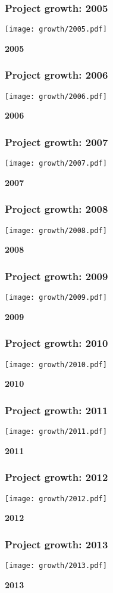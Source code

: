 \documentclass[10pt,xetex]{beamer} %
\begin{document}
\begin{frame}
  \frametitle{Project growth: 2005}
\parbox{0.8\textwidth}{\texttt{[image: growth/2005.pdf]}}\parbox{0.2\textwidth}{{\bf 2005}}

\end{frame}
\begin{frame}
  \frametitle{Project growth: 2006}
\parbox{0.8\textwidth}{\texttt{[image: growth/2006.pdf]}}\parbox{0.2\textwidth}{{\bf 2006}}

\end{frame}
\begin{frame}
  \frametitle{Project growth: 2007}
\parbox{0.8\textwidth}{\texttt{[image: growth/2007.pdf]}}\parbox{0.2\textwidth}{{\bf 2007}}

\end{frame}
\begin{frame}
  \frametitle{Project growth: 2008}
\parbox{0.8\textwidth}{\texttt{[image: growth/2008.pdf]}}\parbox{0.2\textwidth}{{\bf 2008}}

\end{frame}
\begin{frame}
  \frametitle{Project growth: 2009}
\parbox{0.8\textwidth}{\texttt{[image: growth/2009.pdf]}}\parbox{0.2\textwidth}{{\bf 2009}}

\end{frame}
\begin{frame}
  \frametitle{Project growth: 2010}
\parbox{0.8\textwidth}{\texttt{[image: growth/2010.pdf]}}\parbox{0.2\textwidth}{{\bf 2010}}

\end{frame}
\begin{frame}
  \frametitle{Project growth: 2011}
\parbox{0.8\textwidth}{\texttt{[image: growth/2011.pdf]}}\parbox{0.2\textwidth}{{\bf 2011}}

\end{frame}

\begin{frame}
  \frametitle{Project growth: 2012}
\parbox{0.8\textwidth}{\texttt{[image: growth/2012.pdf]}}\parbox{0.2\textwidth}{{\bf 2012}}

\end{frame}

\begin{frame}
  \frametitle{Project growth: 2013}
\parbox{0.8\textwidth}{\texttt{[image: growth/2013.pdf]}}\parbox{0.2\textwidth}{{\bf 2013}}

\end{frame}
\end{document}
